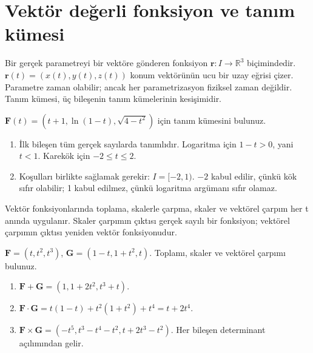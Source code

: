 \section{Vektör değerli fonksiyon ve tanım kümesi}
Bir gerçek parametreyi bir vektöre gönderen fonksiyon \(\mathbf r:I\to\mathbb R^3\) biçimindedir. \(\mathbf r(t)=(x(t),y(t),z(t))\) konum vektörünün ucu bir uzay eğrisi çizer. Parametre zaman olabilir; ancak her parametrizasyon fiziksel zaman değildir. Tanım kümesi, üç bileşenin tanım kümelerinin kesişimidir.

\begin{tcolorbox}[title={Örnek 3.1 | Defterdeki tanım kümesi örneği},colframe=accent]\(\mathbf F(t)=(t+1,\ln(1-t),\sqrt{4-t^2})\) için tanım kümesini bulunuz.
\par{}\end{tcolorbox}
\begin{tcolorbox}[title={Adım adım çözüm},colback=green!3!white,colframe=green]\begin{enumerate}
\item İlk bileşen tüm gerçek sayılarda tanımlıdır. Logaritma için \(1-t>0\), yani \(t<1\). Karekök için \(-2\le t\le2\).
\item Koşulları birlikte sağlamak gerekir: \(I=[-2,1)\). \(-2\) kabul edilir, çünkü kök sıfır olabilir; 1 kabul edilmez, çünkü logaritma argümanı sıfır olamaz.
\end{enumerate}\end{tcolorbox}
Vektör fonksiyonlarında toplama, skalerle çarpma, skaler ve vektörel çarpım her t anında uygulanır. Skaler çarpımın çıktısı gerçek sayılı bir fonksiyon; vektörel çarpımın çıktısı yeniden vektör fonksiyonudur.

\begin{tcolorbox}[title={Örnek 3.2 | Vektör fonksiyonlarıyla işlemler},colframe=accent]\(\mathbf F=(t,t^2,t^3)\), \(\mathbf G=(1-t,1+t^2,t)\). Toplamı, skaler ve vektörel çarpımı bulunuz.
\par{}\end{tcolorbox}
\begin{tcolorbox}[title={Adım adım çözüm},colback=green!3!white,colframe=green]\begin{enumerate}
\item \(\mathbf F+\mathbf G=(1,1+2t^2,t^3+t)\).
\item \(\mathbf F\cdot\mathbf G=t(1-t)+t^2(1+t^2)+t^4=t+2t^4\).
\item \(\mathbf F\times\mathbf G=(-t^5,t^3-t^4-t^2,t+2t^3-t^2)\). Her bileşen determinant açılımından gelir.
\end{enumerate}\end{tcolorbox}
